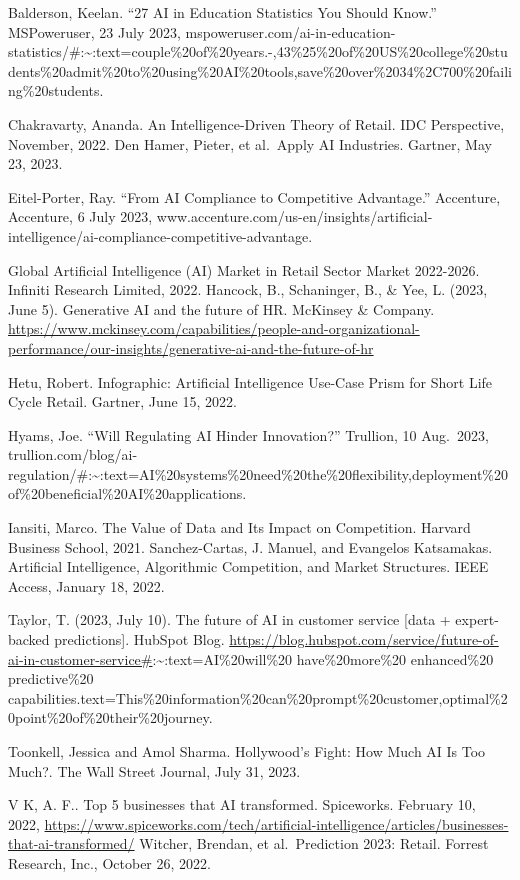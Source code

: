 \documentclass[
]{book}
\begin{document}
Balderson, Keelan. ``27 AI in Education Statistics You Should Know.'' MSPoweruser, 23 July 2023, mspoweruser.com/ai-in-education-statistics/\#:\textasciitilde:text=couple\%20of\%20years.-,43\%25\%20of\%20US\%20college\%20students\%20admit\%20to\%20using\%20AI\%20tools,save\%20over\%2034\%2C700\%20failing\%20students.

Chakravarty, Ananda. An Intelligence-Driven Theory of Retail. IDC Perspective, November, 2022.
Den Hamer, Pieter, et al.~Apply AI Industries. Gartner, May 23, 2023.

Eitel-Porter, Ray. ``From AI Compliance to Competitive Advantage.'' Accenture, Accenture, 6 July 2023, www.accenture.com/us-en/insights/artificial-intelligence/ai-compliance-competitive-advantage.

Global Artificial Intelligence (AI) Market in Retail Sector Market 2022-2026. Infiniti Research Limited, 2022.
Hancock, B., Schaninger, B., \& Yee, L. (2023, June 5). Generative AI and the future of HR. McKinsey \& Company. \url{https://www.mckinsey.com/capabilities/people-and-organizational-performance/our-insights/generative-ai-and-the-future-of-hr}

Hetu, Robert. Infographic: Artificial Intelligence Use-Case Prism for Short Life Cycle Retail. Gartner, June 15, 2022.

Hyams, Joe. ``Will Regulating AI Hinder Innovation?'' Trullion, 10 Aug.~2023, trullion.com/blog/ai-regulation/\#:\textasciitilde:text=AI\%20systems\%20need\%20the\%20flexibility,deployment\%20of\%20beneficial\%20AI\%20applications.

Iansiti, Marco. The Value of Data and Its Impact on Competition. Harvard Business School, 2021.
Sanchez-Cartas, J. Manuel, and Evangelos Katsamakas. Artificial Intelligence, Algorithmic Competition, and Market Structures. IEEE Access, January 18, 2022.

Taylor, T. (2023, July 10). The future of AI in customer service {[}data + expert-backed predictions{]}. HubSpot Blog. \url{https://blog.hubspot.com/service/future-of-ai-in-customer-service\#}:\textasciitilde:text=AI\%20will\%20 have\%20more\%20 enhanced\%20 predictive\%20 capabilities.text=This\%20information\%20can\%20prompt\%20customer,optimal\%20point\%20of\%20their\%20journey.

Toonkell, Jessica and Amol Sharma. Hollywood's Fight: How Much AI Is Too Much?. The Wall Street Journal, July 31, 2023.

V K, A. F.. Top 5 businesses that AI transformed. Spiceworks. February 10, 2022, \url{https://www.spiceworks.com/tech/artificial-intelligence/articles/businesses-that-ai-transformed/}
Witcher, Brendan, et al.~Prediction 2023: Retail. Forrest Research, Inc., October 26, 2022.
\end{document}
